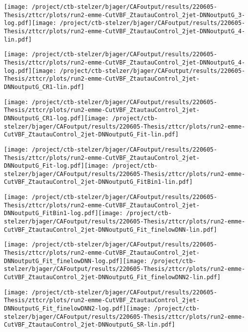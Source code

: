 \documentclass{article}
\begin{document}
\texttt{[image: /project/ctb-stelzer/bjager/CAFoutput/results/220605-Thesis/zttcr/plots/run2-emme-CutVBF\_ZtautauControl\_2jet-DNNoutputG\_3-log.pdf]}\texttt{[image: /project/ctb-stelzer/bjager/CAFoutput/results/220605-Thesis/zttcr/plots/run2-emme-CutVBF\_ZtautauControl\_2jet-DNNoutputG\_4-lin.pdf]}

\texttt{[image: /project/ctb-stelzer/bjager/CAFoutput/results/220605-Thesis/zttcr/plots/run2-emme-CutVBF\_ZtautauControl\_2jet-DNNoutputG\_4-log.pdf]}\texttt{[image: /project/ctb-stelzer/bjager/CAFoutput/results/220605-Thesis/zttcr/plots/run2-emme-CutVBF\_ZtautauControl\_2jet-DNNoutputG\_CR1-lin.pdf]}

\texttt{[image: /project/ctb-stelzer/bjager/CAFoutput/results/220605-Thesis/zttcr/plots/run2-emme-CutVBF\_ZtautauControl\_2jet-DNNoutputG\_CR1-log.pdf]}\texttt{[image: /project/ctb-stelzer/bjager/CAFoutput/results/220605-Thesis/zttcr/plots/run2-emme-CutVBF\_ZtautauControl\_2jet-DNNoutputG\_Fit-lin.pdf]}

\texttt{[image: /project/ctb-stelzer/bjager/CAFoutput/results/220605-Thesis/zttcr/plots/run2-emme-CutVBF\_ZtautauControl\_2jet-DNNoutputG\_Fit-log.pdf]}\texttt{[image: /project/ctb-stelzer/bjager/CAFoutput/results/220605-Thesis/zttcr/plots/run2-emme-CutVBF\_ZtautauControl\_2jet-DNNoutputG\_FitBin1-lin.pdf]}

\texttt{[image: /project/ctb-stelzer/bjager/CAFoutput/results/220605-Thesis/zttcr/plots/run2-emme-CutVBF\_ZtautauControl\_2jet-DNNoutputG\_FitBin1-log.pdf]}\texttt{[image: /project/ctb-stelzer/bjager/CAFoutput/results/220605-Thesis/zttcr/plots/run2-emme-CutVBF\_ZtautauControl\_2jet-DNNoutputG\_Fit\_finelowDNN-lin.pdf]}

\texttt{[image: /project/ctb-stelzer/bjager/CAFoutput/results/220605-Thesis/zttcr/plots/run2-emme-CutVBF\_ZtautauControl\_2jet-DNNoutputG\_Fit\_finelowDNN-log.pdf]}\texttt{[image: /project/ctb-stelzer/bjager/CAFoutput/results/220605-Thesis/zttcr/plots/run2-emme-CutVBF\_ZtautauControl\_2jet-DNNoutputG\_Fit\_finelowDNN2-lin.pdf]}

\texttt{[image: /project/ctb-stelzer/bjager/CAFoutput/results/220605-Thesis/zttcr/plots/run2-emme-CutVBF\_ZtautauControl\_2jet-DNNoutputG\_Fit\_finelowDNN2-log.pdf]}\texttt{[image: /project/ctb-stelzer/bjager/CAFoutput/results/220605-Thesis/zttcr/plots/run2-emme-CutVBF\_ZtautauControl\_2jet-DNNoutputG\_SR-lin.pdf]}
\end{document}
